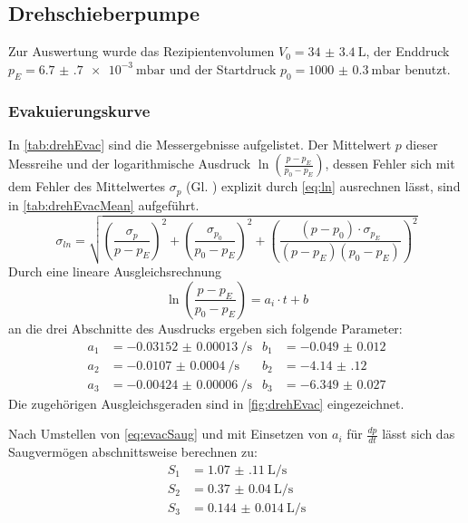 \subsection{Drehschieberpumpe}
    Zur Auswertung wurde das Rezipientenvolumen $V_0 = \SI{34(3.4)}{\liter}$\cite{sample}, der Enddruck $p_E = \qty{6.7(7)e-3}{\milli\bar}$
    und der Startdruck $p_0 = \qty{1000(0.3)}{\milli\bar}$ benutzt.

    \subsubsection{Evakuierungskurve}

    In \autoref{tab:drehEvac} sind die Messergebnisse aufgelistet. Der Mittelwert $p$ dieser Messreihe und der logarithmische Ausdruck
    $\ln\left(\frac{p-p_E}{p_0-p_E}\right)$, dessen Fehler sich mit dem Fehler des Mittelwertes $\sigma_p$ (Gl. ) explizit durch \autoref{eq:ln} ausrechnen lässt, sind in \autoref{tab:drehEvacMean} aufgeführt.
    \begin{equation}
        \sigma_{ln} = \sqrt{\left(\frac{\sigma_p}{p-p_E}\right)^2+\left(\frac{\sigma_{p_0}}{p_0-p_E}\right)^2+\left(\frac{(p-p_0)\cdot\sigma_{p_E}}{(p-p_E)(p_0-p_E)}\right)^2}
        \label{eq:ln}
    \end{equation}
    Durch eine lineare Ausgleichsrechnung 
    \begin{equation*}
        \ln\left(\frac{p-p_E}{p_0-p_E}\right) = a_i \cdot t + b
    \end{equation*}
    an die drei Abschnitte des Ausdrucks ergeben sich folgende Parameter:
    \begin{align*}
        a_1 &= \qty{-0.03152(13)}{\per\second} & b_1 &= \num{-0.049(12)} \\
        a_2 &= \qty{-0.0107(4)}{\per\second} & b_2 &= \num{-4.14(12)} \\
        a_3 &= \qty{-0.00424(6)}{\per\second} & b_3 &= \num{-6.349(27)}
    \end{align*}
    Die zugehörigen Ausgleichsgeraden sind in \autoref{fig:drehEvac} eingezeichnet.

    Nach Umstellen von \autoref{eq:evacSaug} und mit Einsetzen von $a_i$ für $\frac{dp}{dt}$
    lässt sich das Saugvermögen abschnittsweise berechnen zu:
    \begin{align*}
        S_1 &= \qty{1.07(11)}{\liter\per\second} \\
        S_2 &= \qty{0.37(4)}{\liter\per\second} \\
        S_3 &= \qty{0.144(14)}{\liter\per\second} 
    \end{align*}

